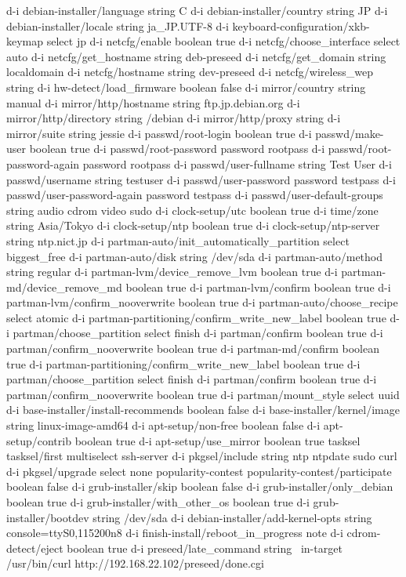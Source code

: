 \documentclass[mingoth,a4paper]{jsarticle}
\begin{document}
{{{{{\begin{commandline}
  d-i debian-installer/language string C
  d-i debian-installer/country string JP
  d-i debian-installer/locale string ja_JP.UTF-8
  d-i keyboard-configuration/xkb-keymap select jp
  d-i netcfg/enable boolean true
  d-i netcfg/choose_interface select auto
  d-i netcfg/get_hostname string deb-preseed
  d-i netcfg/get_domain string localdomain
  d-i netcfg/hostname string dev-preseed
  d-i netcfg/wireless_wep string
  d-i hw-detect/load_firmware boolean false
  d-i mirror/country string manual
  d-i mirror/http/hostname string ftp.jp.debian.org
  d-i mirror/http/directory string /debian
  d-i mirror/http/proxy string
  d-i mirror/suite string jessie
  d-i passwd/root-login boolean true
  d-i passwd/make-user boolean true
  d-i passwd/root-password password rootpass
  d-i passwd/root-password-again password rootpass
  d-i passwd/user-fullname string Test User
  d-i passwd/username string testuser
  d-i passwd/user-password password testpass
  d-i passwd/user-password-again password testpass
  d-i passwd/user-default-groups string audio cdrom video sudo
  d-i clock-setup/utc boolean true
  d-i time/zone string Asia/Tokyo
  d-i clock-setup/ntp boolean true
  d-i clock-setup/ntp-server string ntp.nict.jp
  d-i partman-auto/init_automatically_partition select biggest_free
  d-i partman-auto/disk string /dev/sda
  d-i partman-auto/method string regular
  d-i partman-lvm/device_remove_lvm boolean true
  d-i partman-md/device_remove_md boolean true
  d-i partman-lvm/confirm boolean true
  d-i partman-lvm/confirm_nooverwrite boolean true
  d-i partman-auto/choose_recipe select atomic
  d-i partman-partitioning/confirm_write_new_label boolean true
  d-i partman/choose_partition select finish
  d-i partman/confirm boolean true
  d-i partman/confirm_nooverwrite boolean true
  d-i partman-md/confirm boolean true
  d-i partman-partitioning/confirm_write_new_label boolean true
  d-i partman/choose_partition select finish
  d-i partman/confirm boolean true
  d-i partman/confirm_nooverwrite boolean true
  d-i partman/mount_style select uuid
  d-i base-installer/install-recommends boolean false
  d-i base-installer/kernel/image string linux-image-amd64
  d-i apt-setup/non-free boolean false
  d-i apt-setup/contrib boolean true
  d-i apt-setup/use_mirror boolean true
  tasksel tasksel/first multiselect ssh-server
  d-i pkgsel/include string ntp ntpdate sudo curl
  d-i pkgsel/upgrade select none
  popularity-contest popularity-contest/participate boolean false
  d-i grub-installer/skip boolean false
  d-i grub-installer/only_debian boolean true
  d-i grub-installer/with_other_os boolean true
  d-i grub-installer/bootdev  string /dev/sda
  d-i debian-installer/add-kernel-opts string console=ttyS0,115200n8
  d-i finish-install/reboot_in_progress note
  d-i cdrom-detect/eject boolean true
  d-i preseed/late_command string \
  in-target /usr/bin/curl http://192.168.22.102/preseed/done.cgi
\end{commandline}


}}}}}
\end{document}
